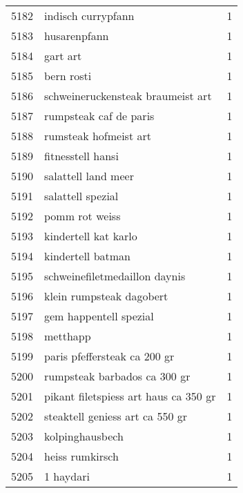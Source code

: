 \begin{tabular}{llr}
5182 &                                 indisch currypfann &      1 \\
5183 &                                       husarenpfann &      1 \\
5184 &                                           gart art &      1 \\
5185 &                                         bern rosti &      1 \\
5186 &                  schweineruckensteak braumeist art &      1 \\
5187 &                             rumpsteak caf de paris &      1 \\
5188 &                              rumsteak hofmeist art &      1 \\
5189 &                                  fitnesstell hansi &      1 \\
5190 &                                salattell land meer &      1 \\
5191 &                                  salattell spezial &      1 \\
5192 &                                     pomm rot weiss &      1 \\
5193 &                               kindertell kat karlo &      1 \\
5194 &                                  kindertell batman &      1 \\
5195 &                      schweinefiletmedaillon daynis &      1 \\
5196 &                           klein rumpsteak dagobert &      1 \\
5197 &                             gem happentell spezial &      1 \\
5198 &                                           metthapp &      1 \\
5199 &                       paris pfeffersteak ca 200 gr &      1 \\
5200 &                       rumpsteak barbados ca 300 gr &      1 \\
5201 &              pikant filetspiess art haus ca 350 gr &      1 \\
5202 &                    steaktell geniess art ca 550 gr &      1 \\
5203 &                                    kolpinghausbech &      1 \\
5204 &                                    heiss rumkirsch &      1 \\
5205 &                                          1 haydari &      1 \\

\end{tabular}
